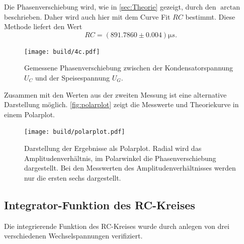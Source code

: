 Die Phasenverschiebung wird, wie in \autoref{sec:Theorie} gezeigt, durch den $\arctan$ beschrieben.
Daher wird auch hier mit dem Curve Fit $RC$ bestimmt. Diese Methode liefert den Wert
\begin{equation}
	RC = (891.7860 \pm 0.004) \si{\micro s}.
	\label{eqn:ergebniss-4c}
\end{equation}

\begin{figure}[H]
	\centering
	\texttt{[image: build/4c.pdf]}
	\caption{Gemessene Phasenverschiebung zwischen der Kondensatorspannung $U_C$ und der Speisespannung
	$U_G$.}
	\label{fig:4c.pdf}
\end{figure}

Zusammen mit den Werten aus der zweiten Messung ist eine alternative Darstellung möglich.
\autoref{fig:polarplot} zeigt die Messwerte und Theoriekurve in einem Polarplot.

\begin{figure}[H]
	\centering
	\texttt{[image: build/polarplot.pdf]}
	\caption{Darstellung der Ergebnisse als Polarplot. Radial wird das Amplitudenverhältnis,
		im Polarwinkel die Phasenverschiebung dargestellt. Bei den Messwerten des 
		Amplitudenverhältnisses werden nur die ersten sechs dargestellt.}
	\label{fig:polarplot}
\end{figure}

\subsection{Integrator-Funktion des RC-Kreises}
\label{sec:4d-auswertung}

Die integrierende Funktion des RC-Kreises wurde durch anlegen von drei
verschiedenen Wechselspannungen verifiziert.

